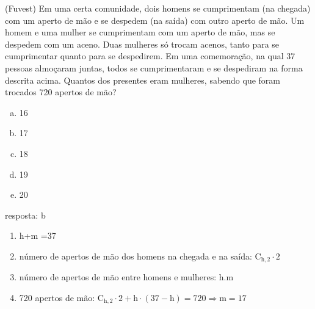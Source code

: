 \begin{ex}
 (Fuvest) Em uma certa comunidade, dois homens se cumprimentam (na chegada) com um aperto de mão e se despedem (na saída) com outro aperto de mão. Um homem e uma mulher se cumprimentam com um aperto de mão, mas se despedem com um aceno. Duas mulheres só trocam acenos, tanto para se cumprimentar quanto para se despedirem.
Em uma comemoração, na qual 37 pessoas almoçaram juntas, todos se cumprimentaram e se despediram na forma descrita acima. Quantos dos presentes eram mulheres, sabendo que foram trocados 720 apertos de mão?
    \begin{enumerate}[(a)]
    \item 16
    \item 17
    \item 18
    \item 19
    \item 20
    \end{enumerate}
      \begin{sol}
       resposta: b  
         \begin{enumerate} [--]
             \item  h+m =37
             \item  número de apertos de mão dos homens na chegada e na saída:  $\mathrm{C}_{\mathrm{h},2}\cdot2$
             \item número de apertos de mão entre homens e mulheres: h.m
             \item 720 apertos de mão:
             $\mathrm{\mathrm{C}}_{\mathrm{h},2}\cdot2 + \mathrm{h}\cdot(37-\mathrm{h})=720\Longrightarrow \mathrm{m}=17$
         \end{enumerate}

      \end{sol}
\end{ex}